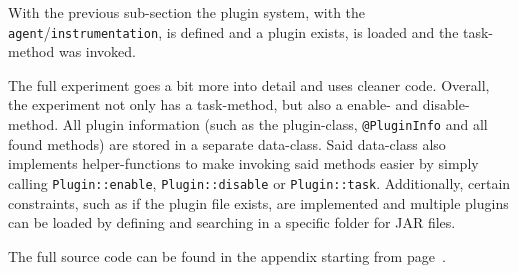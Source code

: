 With the previous sub-section the plugin system, with the \texttt{agent}/\lstinline{instrumentation}, is defined and a plugin exists, is loaded and the task-method was invoked.

The full experiment goes a bit more into detail and uses cleaner code.
Overall, the experiment not only has a task-method, but also a enable- and disable-method.
All plugin information (such as the plugin-class, \lstinline{@PluginInfo} and all found methods) are stored in a separate data-class.
Said data-class also implements helper-functions to make invoking said methods easier by simply calling \lstinline{Plugin::enable}, \lstinline{Plugin::disable} or \lstinline{Plugin::task}.
Additionally, certain constraints, such as if the plugin file exists, are implemented and multiple plugins can be loaded by defining and searching in a specific folder for JAR files.

The full source code can be found in the appendix starting from page~\pageref{subsec:Experiment Source Code}.

\clearpage

